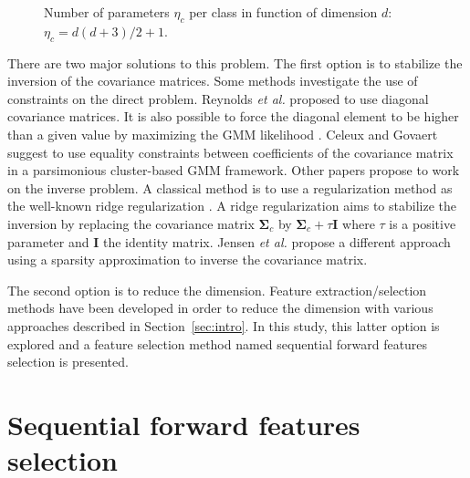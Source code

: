 \documentclass[journal,10pt]{IEEEtran}
\begin{document}
    \begin{figure}[!t]
        \centering
        \caption{Number of parameters $\eta_c$ per class in function of dimension $d$: $\eta_c=d(d+3)/2+1$.\label{fig:nb-param}}
    \end{figure}

    There are two major solutions to this problem. The first option is to stabilize the inversion of the covariance matrices. Some methods investigate the use of constraints on the direct problem. Reynolds \emph{et al.} \cite{reynolds1995robust} proposed to use diagonal covariance matrices. It is also possible to force the diagonal element to be higher than a given value by maximizing the GMM likelihood \cite{hathaway1985constrained}. Celeux and Govaert \cite{celeux1995gaussian} suggest to use equality constraints between coefficients of the covariance matrix in a parsimonious cluster-based GMM framework. Other papers propose to work on the inverse problem. A classical method is to use a regularization method as the well-known ridge regularization \cite{hoerl1970ridge}. A ridge regularization aims to stabilize the inversion by replacing the covariance matrix $\boldsymbol{\Sigma}_c$ by $\boldsymbol{\Sigma}_c + \tau \mathbf{I}$ where $\tau$ is a positive parameter and $\mathbf{I}$ the identity matrix. Jensen \emph{et al.} \cite{jensen2008regression} propose a different approach using a sparsity approximation to inverse the covariance matrix.

    The second option is to reduce the dimension. Feature extraction/selection methods have been developed in order to reduce the dimension with various approaches described in Section~\ref{sec:intro}. In this study, this latter option is explored and a feature selection method named sequential forward features selection is presented.

\section{Sequential forward features selection}
\label{sec:selection}
\end{document}
